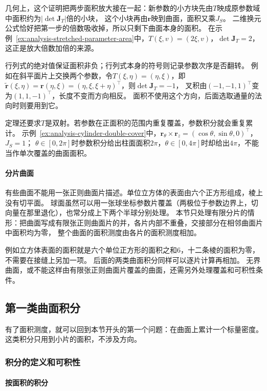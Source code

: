 几何上，这个证明把两步面积放大接在一起：新参数的小方块先由$T$映成原参数域中面积约为$|\det\bm J_T|$倍的小块，
这个小块再由$\bm r$映到曲面，面积又乘$J_S$。
二维换元公式恰好把第一步的倍数吸收掉，所以只剩下曲面本身的面积。
在示例~\ref{ex:analysis-stretched-parameter-area}中，$T(\xi,v)=(2\xi,v)$，$\det\bm J_T=2$，这正是放大倍数加倍的来源。

行列式的绝对值保证面积非负；行列式本身的符号则记录参数次序是否翻转。
例如在斜平面片上交换两个参数，令$T(\xi,\eta)=(\eta,\xi)$，即$\widetilde{\bm r}(\xi,\eta)=\bm r(\eta,\xi)=(\eta,\xi,\xi+\eta)^\top$，则$\det\bm J_T=-1$，
叉积由$(-1,-1,1)^\top$变为$(1,1,-1)^\top$，长度不变而方向相反。
面积不使用这个方向，后面选取通量的法向时则要用到它。

定理还要求$T$是双射。若参数在正面积的范围内重复覆盖，参数积分就会重复累计。
示例~\ref{ex:analysis-cylinder-double-cover}中，$\bm r_\theta\times\bm r_z=(\cos\theta,\sin\theta,0)^\top$，$J_S=1$；
$\theta\in[0,2\pi]$时参数积分给出柱面面积$2\pi$，$\theta\in[0,4\pi]$时却给出$4\pi$，不能当作单次覆盖的曲面面积。

\paragraph{分片曲面}

有些曲面不能用一张正则曲面片描述。单位立方体的表面由六个正方形组成，棱上没有切平面。
球面虽然可以用一张球坐标参数片覆盖（两极位于参数边界上，切向量在那里退化），也常分成上下两个半球分别处理。
本节只处理有限分片的情形：把曲面写成有限张正则曲面片的并，各片内部不重叠，交接部分在相邻曲面片中面积均为零，
整个曲面的面积测度由各片的面积测度相加。

例如立方体表面的面积就是六个单位正方形的面积之和$6$，十二条棱的面积为零，不需要在接缝上另加一项。
后面的两类曲面积分同样可以逐片计算再相加。
无界曲面，或不能这样由有限张正则曲面片覆盖的曲面，还需另外处理覆盖和可积性条件。

\subsection{第一类曲面积分}

有了面积测度，就可以回到本节开头的第一个问题：在曲面上累计一个标量密度。
这类积分只用到小片的面积，不涉及方向。

\subsubsection{积分的定义和可积性}

\paragraph{按面积的积分}


